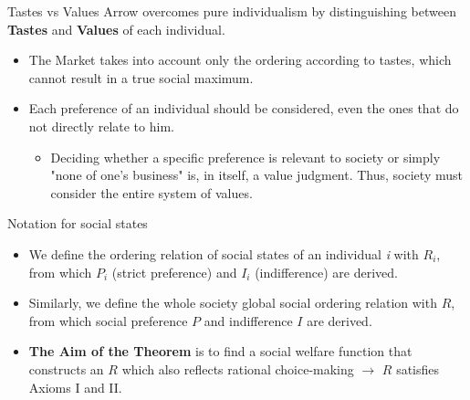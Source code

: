 \documentclass{beamer}
\begin{document}
\begin{frame}{Tastes vs Values}
    Arrow overcomes pure individualism by distinguishing between \textbf{Tastes} and \textbf{Values} of each individual.
    \vspace{0.5 cm}
    \begin{itemize}
        \item The Market takes into account only the ordering according to tastes, which cannot result in a true social maximum.
        \item Each preference of an individual should be considered, even the ones that do not directly relate to him.
        \begin{itemize}
            \item[$\Rightarrow$] Deciding whether a specific preference is relevant to society or simply "none of one's business" is, in itself, a value judgment. Thus, society must consider the entire system of values.
        \end{itemize}
    \end{itemize}
\end{frame}

\begin{frame}{Notation for social states}
    \begin{itemize}
        \item We define the ordering relation of social states of an individual \textit{i} with $R_i$, from which $P_i$ (strict preference) and $I_i$ (indifference) are derived.
        \vspace{0.5 cm}
        \item Similarly, we define the whole society global social ordering relation with $R$, from which social preference $P$ and indifference $I$ are derived.
        \vspace{0.5 cm}
        \item \textbf{The Aim of the Theorem} is to find a social welfare function that constructs an $R$ which also reflects rational choice-making $\rightarrow$ $R$ satisfies Axioms I and II.
    \end{itemize}
\end{frame}
\end{document}
